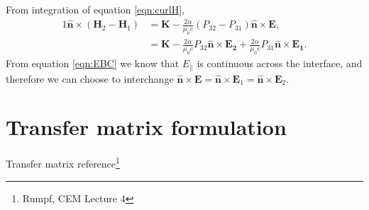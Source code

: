 \documentclass[notitlepage,nofootinbib]{revtex4-1}
\renewcommand{\vec}[1]{\mathbf{#1}}
\begin{document}
From integration of equation \eqref{eqn:curlH},
\begin{alignat}{1}
	\label{eqn:HBC}
	\vec{\hat{n}} \times (\vec{H}_2 - \vec{H}_1)
	&=
	\vec{K} - \frac{2\alpha}{\mu_0c}(P_{32}-P_{31}) \vec{\hat{n}} \times \vec{E},
	\\
	&=
	\vec{K}
	-\frac{2\alpha}{\mu_0c}P_{32}\vec{\hat{n}}\times\vec{E_2}
	+\frac{2\alpha}{\mu_0c}P_{31}\vec{\hat{n}}\times\vec{E_1}.
\end{alignat}
From equation \eqref{eqn:EBC} we know that $ E_\parallel $ is continuous across the interface, and therefore we can choose to interchange $ \vec{\hat{n}} \times \vec{E} = \vec{\hat{n}} \times \vec{E}_1 = \vec{\hat{n}} \times \vec{E}_2 $.


\section{Transfer matrix formulation}

Transfer matrix reference\footnote{Rumpf, CEM Lecture 4}
\end{document}
